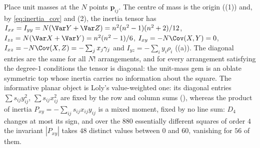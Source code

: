\begin{remark}
\label{rem:inertia}
Place unit masses at the $N$ points $\mathbf p_{ij}$.  The centre of mass is the origin ((1)) and, by
\eqref{eq:inertia_cov} and (2), the inertia tensor has
$I_{xx}=I_{yy}=N(\Var Y+\Var Z)=n^{2}(n^{2}-1)(n^{2}+2)/12$, $I_{zz}=N(\Var X+\Var Y)=n^{2}(n^{2}-1)/6$, $I_{xy}=-N\Cov(X,Y)=0$,
$I_{xz}=-N\Cov(X,Z)=-\sum_jx_j\gamma_j$ and $I_{yz}=-\sum_iy_i\rho_i$ ((a)).
The diagonal entries are the same for all $N!$ arrangements, and for every arrangement satisfying the degree-$1$ conditions the
tensor is diagonal: the unit-mass gem is an oblate symmetric top whose inertia carries no information about the square.
The informative planar object is Loly's value-weighted one: its diagonal entries $\sum s_{ij}y_{ij}^{2}$, $\sum s_{ij}x_{ij}^{2}$
are fixed by the row and column sums (), whereas the product of inertia $P_{xy}=-\sum_{ij}s_{ij}x_{ij}y_{ij}$ is a
mixed moment, fixed by no line sum: $D_4$ changes at most its sign, and over the $880$ essentially different squares of order $4$
the invariant $|P_{xy}|$ takes $48$ distinct values between $0$ and $60$, vanishing for $56$ of them.
\end{remark}
